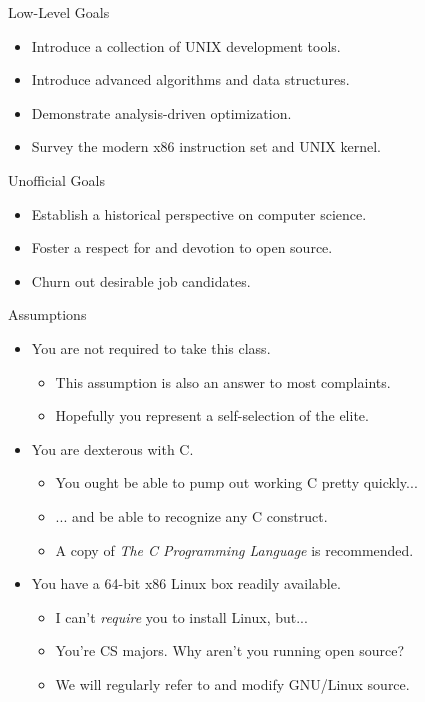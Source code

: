 \documentclass{beamer}
\begin{document}
\begin{frame}{Low-Level Goals}
\begin{itemize}
\item Introduce a collection of UNIX development tools.
\item Introduce advanced algorithms and data structures.
\item Demonstrate analysis-driven optimization.
\item Survey the modern x86 instruction set and UNIX kernel.
\end{itemize}
\end{frame}

\begin{frame}{Unofficial Goals}
\begin{itemize}
\item Establish a historical perspective on computer science.
\item Foster a respect for and devotion to open source.
\item Churn out desirable job candidates.
\end{itemize}
\end{frame}

\begin{frame}{Assumptions}
\begin{itemize}
\item You are not required to take this class.
\begin{itemize}
\item This assumption is also an answer to most complaints.
\item Hopefully you represent a self-selection of the elite.
\end{itemize}
\item You are dexterous with C.
\begin{itemize}
\item You ought be able to pump out working C pretty quickly...
\item ... and be able to recognize any C construct.
\item A copy of {\it The C Programming Language} is recommended.
\end{itemize}
\item You have a 64-bit x86 Linux box readily available.
\begin{itemize}
\item I can't {\it require} you to install Linux, but...
\item You're CS majors. Why aren't you running open source?
\item We will regularly refer to and modify GNU/Linux source.
\end{itemize}
\end{itemize}
\end{frame}
\end{document}
